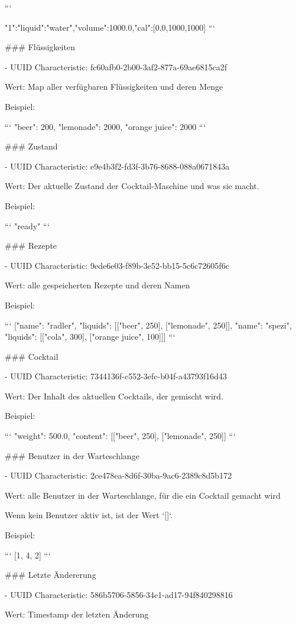 ```
{"1":{"liquid":"water","volume":1000.0,"cal":[0.0,1000,1000]}
	```
	
	### Flüssigkeiten
	
	- UUID Characteristic: fc60afb0-2b00-3af2-877a-69ae6815ca2f
	
	Wert: Map aller verfügbaren Flüssigkeiten und deren Menge
	
	Beispiel:
	
	```
	{"beer": 200, "lemonade": 2000, "orange juice": 2000}
	```
	
	### Zustand
	
	- UUID Characteristic: e9e4b3f2-fd3f-3b76-8688-088a0671843a
	
	Wert: Der aktuelle Zustand der Cocktail-Maschine und was sie macht.
	
	Beispiel:
	
	```
	"ready"
	```
	
	### Rezepte
	
	- UUID Characteristic: 9ede6e03-f89b-3e52-bb15-5c6c72605f6c
	
	Wert: alle gespeicherten Rezepte und deren Namen
	
	Beispiel:
	
	```
	[{"name": "radler", "liquids": [["beer", 250], ["lemonade", 250]]}, {"name": "spezi", "liquids": [["cola", 300], ["orange juice", 100]]}]
	```
	
	### Cocktail
	
	- UUID Characteristic: 7344136f-c552-3efc-b04f-a43793f16d43
	
	Wert: Der Inhalt des aktuellen Cocktails, der gemischt wird.
	
	Beispiel:
	
	```
	{"weight": 500.0, "content": [["beer", 250], ["lemonade", 250]]}
	```
	
	### Benutzer in der Warteschlange
	
	- UUID Characteristic: 2ce478ea-8d6f-30ba-9ac6-2389c8d5b172
	
	Wert: alle Benutzer in der Warteschlange, für die ein Cocktail gemacht wird
	
	Wenn kein Benutzer aktiv ist, ist der Wert `[]`.
	
	Beispiel:
	
	```
	[1, 4, 2]
	```
	
	### Letzte Ändererung
	
	- UUID Characteristic: 586b5706-5856-34e1-ad17-94f840298816
	
	Wert: Timestamp der letzten Änderung
	
}
